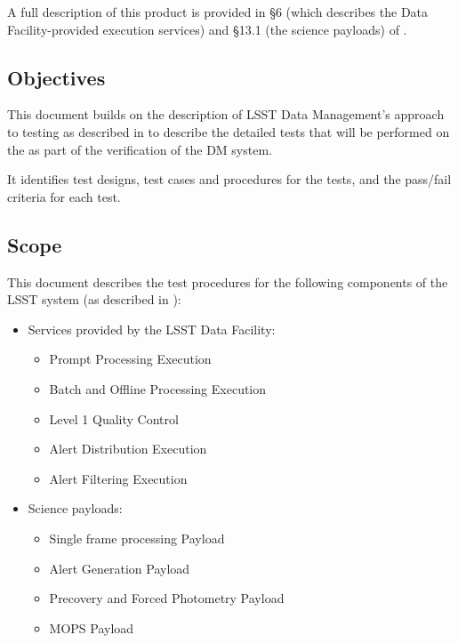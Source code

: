 \documentclass[DM,lsstdraft,STS,toc]{lsstdoc}
\begin{document}
A full description of this product is provided in \S6 (which describes the
Data Facility-provided execution services) and \S13.1 (the science payloads) of
.

\subsection{Objectives}
\label{sec:objectives}

This document builds on the description of LSST Data Management's approach to
testing as described in  to describe the detailed tests that
will be performed on the \product{} as part of the verification of the DM system.

It identifies test designs, test cases and procedures for the tests, and the
pass/fail criteria for each test.

\subsection{Scope}
\label{sec:scope}

This document describes the test procedures for the following components of
the LSST system (as described in ):

\begin{itemize}

  \item{Services provided by the LSST Data Facility:

    \begin{itemize}
      \item{Prompt Processing Execution}
      \item{Batch and Offline Processing Execution}
      \item{Level 1 Quality Control}
      \item{Alert Distribution Execution}
      \item{Alert Filtering Execution}
    \end{itemize}
  }

  \item{Science payloads:

    \begin{itemize}
      \item{Single frame processing Payload}
      \item{Alert Generation Payload}
      \item{Precovery and Forced Photometry Payload}
      \item{MOPS Payload}
    \end{itemize}

  }

\end{itemize}
\end{document}
